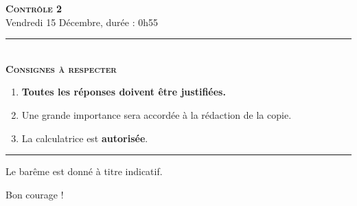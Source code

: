 \documentclass[11pt]{article}
\begin{document}

\begin{center}
\textbf{\LARGE \textsc{Contrôle 2}}\\[2mm]

{\large Vendredi 15 Décembre, durée : 0h55}\\[1mm]
\noindent\rule{8cm}{0.4pt}\\[1mm]
\textbf{\textsc{Consignes à respecter}}
\begin{enumerate}[label=\textbf{\arabic*/}]
\item \textbf{Toutes les réponses doivent être justifiées.}
\item Une grande importance sera accordée à la rédaction de la
  copie.
\item La calculatrice est \textbf{autorisée}.
    \end{enumerate}
\noindent\rule{12cm}{0.4pt}
\end{center}

\vspace{2mm}
\noindent Le barême est donné à titre indicatif.
\vspace{2mm}
\begin{center}
  Bon courage !
\end{center}
\end{document}

